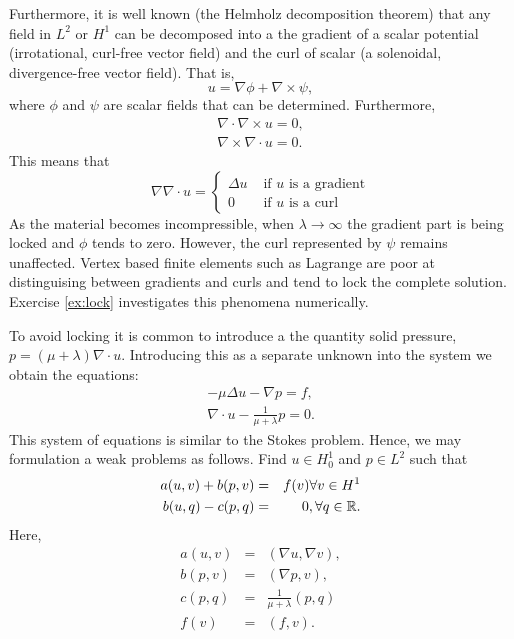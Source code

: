 Furthermore, it is well known (the Helmholz decomposition theorem) that any field in $L^2$ or $H^1$ can be decomposed
into a the gradient of a scalar potential (irrotational, curl-free vector field)
and the curl of scalar (a solenoidal, divergence-free vector field). That is,
\[
u = \nabla \phi + \nabla \times \psi, 
\]
where $\phi$ and $\psi$ are scalar fields that can be determined. 
Furthermore, 
\begin{eqnarray}
\nabla\cdot\nabla\times u = 0, \\
\nabla\times\nabla\cdot u = 0. 
\end{eqnarray}
This means that
\[
\nabla\nabla\cdot u = \left\{ \begin{array}{cc}
                          \Delta u & \mbox{ if } u \mbox{ is a gradient} \\
                                             0  & \mbox{ if } u \mbox{ is a curl}
                          \end{array} \right. 
\]
As the material becomes incompressible, when $\lambda\rightarrow\infty$ the gradient
part is being locked and $\phi$ tends to zero. However, the curl represented by $\psi$
remains unaffected. Vertex based finite elements such as Lagrange are poor
at distinguising between gradients and curls and tend to lock the complete solution.
Exercise \ref{ex:lock} investigates this phenomena numerically.

To avoid locking it is common to introduce a the quantity solid pressure,
$p = (\mu + \lambda) \nabla \cdot u$. Introducing this as a separate
unknown into the system we obtain the equations:
\begin{eqnarray*}
-\mu \Delta u - \nabla p = f, \\
\nabla\cdot u - \frac{1}{\mu + \lambda} p = 0 . 
\end{eqnarray*}
This system of equations is similar to the Stokes problem.
Hence, we may formulation a weak problems as follows.
Find $u\in H^1_0$ and $p \in L^2$ such that
\begin{eqnarray}
a(u,v) + b(p, v) &=& f(v) \forall v\in H^1 \\
b(u, q) - c(p,q) &=& 0, \forall q \in \mathbb{R}.
\end{eqnarray}
Here,
\begin{eqnarray}
a(u,v) &=& (\nabla u, \nabla v), \\
b(p, v) &=& (\nabla p, v), \\
c(p,q) &=& \frac{1}{\mu + \lambda}(p,q)\\
f(v) &=& (f,v).
\end{eqnarray}

